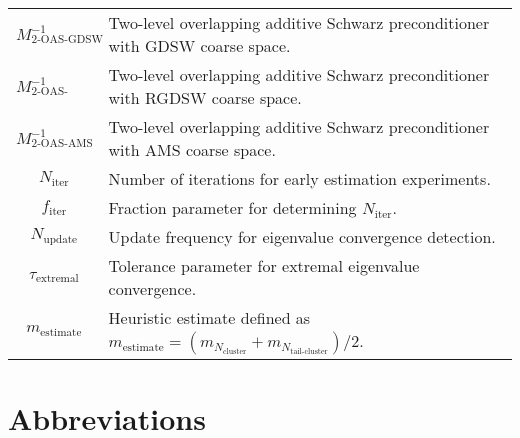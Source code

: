 \begin{longtable}{c p{10cm}}
    $M^{-1}_{\text{2-OAS-GDSW}}$                       & Two-level overlapping additive Schwarz preconditioner with GDSW coarse space.                                            \\
    $M^{-1}_{\text{2-OAS-RGDSW}}$                      & Two-level overlapping additive Schwarz preconditioner with RGDSW coarse space.                                           \\
    $M^{-1}_{\text{2-OAS-AMS}}$                        & Two-level overlapping additive Schwarz preconditioner with AMS coarse space.                                             \\
    $N_{\text{iter}}$                                  & Number of iterations for early estimation experiments.                                                                   \\
    $f_{\text{iter}}$                                  & Fraction parameter for determining $N_{\text{iter}}$.                                                                    \\
    $N_{\text{update}}$                                & Update frequency for eigenvalue convergence detection.                                                                   \\
    $\tau_{\text{extremal}}$                           & Tolerance parameter for extremal eigenvalue convergence.                                                                 \\
    $m_{\text{estimate}}$                              & Heuristic estimate defined as $m_{\text{estimate}} = (m_{N_{\text{cluster}}} + m_{N_{\text{tail-cluster}}})/2$. \\
\end{longtable}

\section*{Abbreviations}

